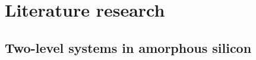 %
\chapter{Literature research}
\label{sec:related}


\Blindtext[2][1]

\section{Two-level systems in amorphous silicon}

\label{sec:related1:sec1}

\Blindtext[2][2]

